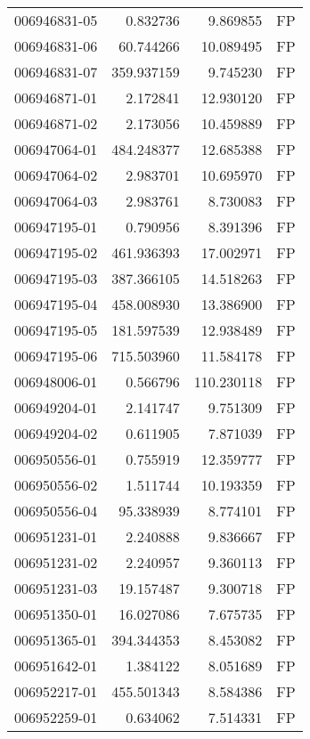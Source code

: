 \begin{tabular}{lrrl}
006946831-05 &    0.832736 &       9.869855 &   FP \\
006946831-06 &   60.744266 &      10.089495 &   FP \\
006946831-07 &  359.937159 &       9.745230 &   FP \\
006946871-01 &    2.172841 &      12.930120 &   FP \\
006946871-02 &    2.173056 &      10.459889 &   FP \\
006947064-01 &  484.248377 &      12.685388 &   FP \\
006947064-02 &    2.983701 &      10.695970 &   FP \\
006947064-03 &    2.983761 &       8.730083 &   FP \\
006947195-01 &    0.790956 &       8.391396 &   FP \\
006947195-02 &  461.936393 &      17.002971 &   FP \\
006947195-03 &  387.366105 &      14.518263 &   FP \\
006947195-04 &  458.008930 &      13.386900 &   FP \\
006947195-05 &  181.597539 &      12.938489 &   FP \\
006947195-06 &  715.503960 &      11.584178 &   FP \\
006948006-01 &    0.566796 &     110.230118 &   FP \\
006949204-01 &    2.141747 &       9.751309 &   FP \\
006949204-02 &    0.611905 &       7.871039 &   FP \\
006950556-01 &    0.755919 &      12.359777 &   FP \\
006950556-02 &    1.511744 &      10.193359 &   FP \\
006950556-04 &   95.338939 &       8.774101 &   FP \\
006951231-01 &    2.240888 &       9.836667 &   FP \\
006951231-02 &    2.240957 &       9.360113 &   FP \\
006951231-03 &   19.157487 &       9.300718 &   FP \\
006951350-01 &   16.027086 &       7.675735 &   FP \\
006951365-01 &  394.344353 &       8.453082 &   FP \\
006951642-01 &    1.384122 &       8.051689 &   FP \\
006952217-01 &  455.501343 &       8.584386 &   FP \\
006952259-01 &    0.634062 &       7.514331 &   FP \\

\end{tabular}
